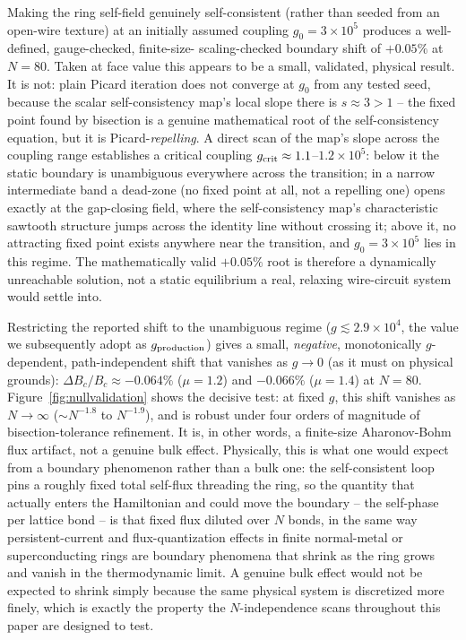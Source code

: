 \documentclass[aps,physrev,reprint,superscriptaddress,amsmath,amssymb,floatfix]{revtex4-2}
\begin{document}
Making the ring self-field genuinely self-consistent (rather than seeded
from an open-wire texture) at an initially assumed coupling
$g_0=3\times10^5$ produces a well-defined, gauge-checked, finite-size-
scaling-checked boundary shift of $+0.05\%$ at $N=80$. Taken at face
value this appears to be a small, validated, physical result. It is not:
plain Picard iteration does not converge at $g_0$ from any tested seed,
because the scalar self-consistency map's local slope there is $s\approx
3>1$ -- the fixed point found by bisection is a genuine mathematical root
of the self-consistency equation, but it is Picard-\emph{repelling}. A
direct scan of the map's slope across the coupling range establishes a
critical coupling $g_{\rm crit}\approx1.1$--$1.2\times10^5$: below it the
static boundary is unambiguous everywhere across the transition; in a
narrow intermediate band a dead-zone (no fixed point at all, not a
repelling one) opens exactly at the gap-closing field, where the
self-consistency map's characteristic sawtooth structure jumps across the
identity line without crossing it; above it, no attracting fixed point
exists anywhere near the transition, and $g_0=3\times10^5$ lies in this
regime. The mathematically valid $+0.05\%$ root is therefore a
dynamically unreachable solution, not a static equilibrium a real,
relaxing wire-circuit system would settle into.

Restricting the reported shift to the unambiguous regime ($g\lesssim
2.9\times10^4$, the value we subsequently adopt as $g_{\rm production}$)
gives a small, \emph{negative}, monotonically $g$-dependent,
path-independent shift that vanishes as $g\to0$ (as it must on physical
grounds): $\Delta B_c/B_c\approx-0.064\%$ ($\mu=1.2$) and $-0.066\%$
($\mu=1.4$) at $N=80$. Figure~\ref{fig:nullvalidation} shows the decisive
test: at fixed $g$, this shift vanishes as $N\to\infty$
($\sim N^{-1.8}$ to $N^{-1.9}$), and is robust under four orders of
magnitude of bisection-tolerance refinement. It is, in other words, a
finite-size Aharonov-Bohm flux artifact, not a genuine bulk effect.
Physically, this is what one would expect from a boundary phenomenon
rather than a bulk one: the self-consistent loop pins a roughly fixed
total self-flux threading the ring, so the quantity that actually enters
the Hamiltonian and could move the boundary -- the self-phase per lattice
bond -- is that fixed flux diluted over $N$ bonds, in the same way
persistent-current and flux-quantization effects in finite normal-metal
or superconducting rings are boundary phenomena that shrink as the ring
grows and vanish in the thermodynamic limit. A genuine bulk effect would
not be expected to shrink simply because the same physical system is
discretized more finely, which is exactly the property the $N$-independence
scans throughout this paper are designed to test.
\end{document}
